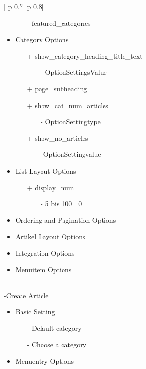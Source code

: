 \begin{minipage}{0.7\textwidth}
\begin{longtable}{| p {0.7\textwidth} |p {0.8\textwidth}|}
\begin{itemize}
	\begin{enumerate}
			\item[-] featured\_categories
	 \end{enumerate}
\item Category Options
	\begin{enumerate}
		\item[+] show\_category\_heading\_title\_text
			\begin{enumerate}
			\item[|-] OptionSettingsValue
			\end{enumerate}
	 \item[+] page\_subheading
	 \item[+] show\_cat\_num\_articles
    		\begin{enumerate}
    			\item[|-] OptionSettingtype
    		\end{enumerate} 
	 \item[+] show\_no\_articles
	 	\begin{enumerate}
	 		\item[-] OptionSettingvalue
	 	\end{enumerate}  
	\end{enumerate}
\item List Layout Options
\begin{enumerate}
   	   	\item[+] display\_num
   	   	\begin{enumerate}
   	   				\item[|-] 5 bis 100 | 0
   	   			\end{enumerate}
   	   	\end{enumerate}
\item Ordering and Pagination Options
\item Artikel Layout Options
\item Integration Options
\item Menuitem Options 
\end{itemize}
\\ -Create Article
\begin{itemize}
\item Basic Setting
	\begin{enumerate}
			\item[-] Default category 
			\item[-] Choose a category 
	 \end{enumerate}
\item Menuentry Options
\end{itemize}

\end{longtable}
\end{minipage}
